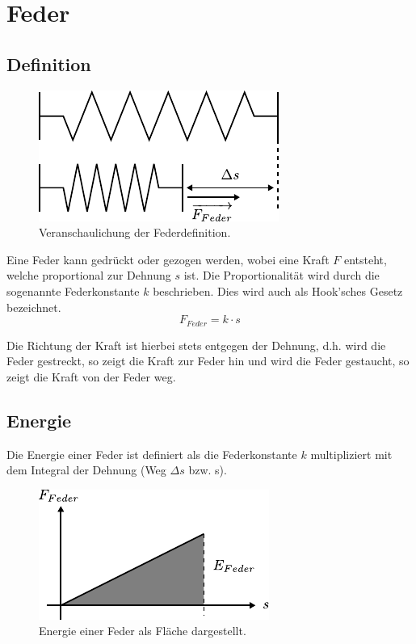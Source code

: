 \chapter{Feder}

\newpage
\section{Definition}

\begin{figure}[h!]
	\centering
	\includegraphics[scale=0.75]{feder-dehnung.pdf}
	\caption{Veranschaulichung der Federdefinition.}
	\label{fig:feder-dehnung}
\end{figure}

\noindent
Eine Feder kann gedrückt oder gezogen werden, wobei eine Kraft $F$ entsteht,
welche proportional zur Dehnung $s$ ist. Die Proportionalität wird durch die
sogenannte Federkonstante $k$ beschrieben. Dies wird auch als Hook'sches
Gesetz bezeichnet.
\[ \boxed{F_{Feder} = k \cdot s} \]

\noindent
Die Richtung der Kraft ist hierbei stets entgegen der Dehnung, d.h. wird die
Feder gestreckt, so zeigt die Kraft zur Feder hin und wird die Feder
gestaucht, so zeigt die Kraft von der Feder weg.

\section{Energie}\label{sec:feder-energie}
Die Energie einer Feder ist definiert als die Federkonstante $k$ multipliziert
mit dem Integral der Dehnung (Weg $\Delta s$ bzw. s).
\begin{figure}[h!]
	\centering
	\includegraphics[scale=0.9]{feder-energie.pdf}
	\caption{Energie einer Feder als Fläche dargestellt.}
	\label{fig:feder-energie}
\end{figure}


